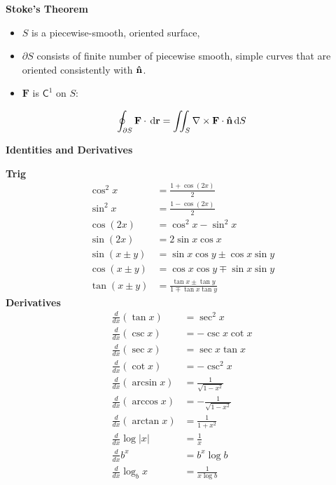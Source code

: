 \documentclass[10pt]{article}
\newcommand\sectionheading[1]{\begin{center}\large{\textbf{#1}}\end{center}\normalsize}
\newcommand\heading[1]{\smallskip\textbf{#1}\smallskip}
\newcommand{\C}{{\mathsf C}}
\newcommand{\bv}[1]{\mathbf{#1}}                                %
\newcommand{\uv}[1]{{\bm{\hat{\textnormal{\bfseries #1}}}}}     %
\newcommand{\F}{\bv F}
\newcommand{\n}{\uv n}
\renewcommand{\r}{\bv r}
\renewcommand{\d}{\,\mathrm{d}}
\newcommand{\p}{\partial}
\newcommand{\curl}{\nabla\times}
\begin{document}
\begin{multicols*}{2}
\heading{Stoke's Theorem}

\begin{itemize}[itemsep=0pt,topsep=0pt]
    \item $S$ is a piecewise-smooth, oriented surface,
    \item $\p S$ consists of finite number of piecewise smooth, simple curves that are oriented consistently with $\n$.
    \item $\F$ is $\C^1$ on $S$:
\end{itemize}
\[\oint_{\p S}\F\cdot\d\r=\iint_S\curl\F\cdot\n\d S\]

\newcolumn
\sectionheading{Identities and Derivatives}
\heading{Trig}
\begin{align*}
    \cos^2 x        &=\frac{1+\cos(2x)}{2} \\
    \sin^2 x        &=\frac{1-\cos(2x)}{2} \\
    \cos(2x)        &=\cos^2 x-\sin^2 x \\ 
    \sin(2x)        &=2\sin x\cos x \\
    \sin(x\pm y)    &=\sin x \cos y \pm \cos x \sin y \\
    \cos(x\pm y)    &=\cos x \cos y \mp \sin x \sin y \\
    \tan(x\pm y)    &=\frac{\tan x \pm \tan y}{1 \mp \tan x \tan y}
\end{align*}
\heading{Derivatives} 
\begin{align*}
    \frac{d}{dx} (\tan x)       &= \sec^2 x \\
    \frac{d}{dx} (\csc x)       &= -\csc x \cot x \\
    \frac{d}{dx} (\sec x)       &= \sec x \tan x \\
    \frac{d}{dx} (\cot x)       &= -\csc^2 x \\
    \frac{d}{dx} (\arcsin x)    &= \frac{1}{\sqrt{1-x^2}} \\
    \frac{d}{dx} (\arccos x)    &= -\frac{1}{\sqrt{1-x^2}} \\
    \frac{d}{dx} (\arctan x)    &=\frac{1}{1+x^2} \\
    \frac{d}{dx} \log |x|       &= \frac{1}{x} \\
    \frac{d}{dx} b^x            &= b^x \log b \\
    \frac{d}{dx} \log_b x       &=\frac{1}{x\log b} \\
\end{align*}

\end{multicols*}
\end{document}
